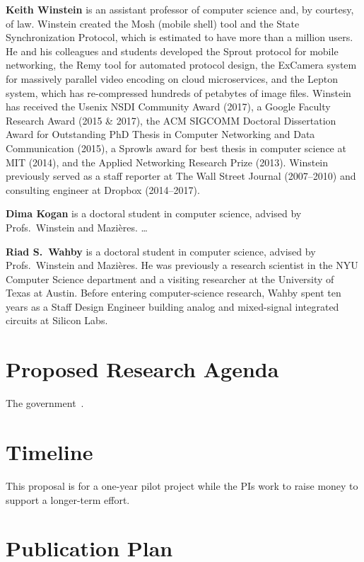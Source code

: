 \documentclass[11pt]{article}
\newcommand{\slim}{\vspace{\baselineskip}}
\begin{document}
\noindent \textbf{Keith Winstein} is an assistant professor of computer science
and, by courtesy, of law. Winstein created the Mosh (mobile shell)
tool and the State Synchronization Protocol, which is estimated to
have more than a million users. He and his colleagues and students
developed the Sprout protocol for mobile networking, the Remy tool for
automated protocol design, the ExCamera system for massively parallel
video encoding on cloud microservices, and the Lepton system, which
has re-compressed hundreds of petabytes of image files. Winstein has
received the Usenix NSDI Community Award (2017), a Google Faculty
Research Award (2015 \& 2017), the ACM SIGCOMM Doctoral Dissertation
Award for Outstanding PhD Thesis in Computer Networking and Data
Communication (2015), a Sprowls award for best thesis in computer
science at MIT (2014), and the Applied Networking Research Prize
(2013). Winstein previously served as a staff reporter at The Wall
Street Journal (2007--2010) and consulting engineer at Dropbox
(2014--2017).

\slim

\noindent \textbf{Dima Kogan} is a doctoral student in computer science,
advised by Profs.~Winstein and Mazi\`{e}res. \ldots

\slim

\noindent \textbf{Riad S.~Wahby} is a doctoral student in computer science,
advised by Profs.~Winstein and Mazi\`{e}res. He was previously a
research scientist in the NYU Computer Science department and a
visiting researcher at the University of Texas at Austin. Before
entering computer-science research, Wahby spent ten years as a Staff
Design Engineer building analog and mixed-signal integrated circuits
at Silicon Labs.


\section{Proposed Research Agenda}

The government~\cite{cyberframework, nistSSH, trumpeo}.

\section{Timeline}

This proposal is for a one-year pilot project while the PIs work to
raise money to support a longer-term effort.

\section{Publication Plan}
\end{document}
